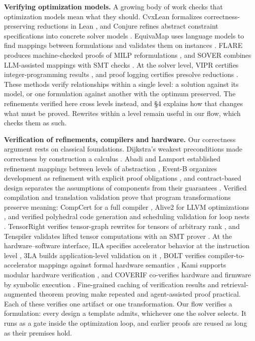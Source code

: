 \documentclass[11pt]{article}
\begin{document}
\textbf{Verifying optimization models.} A growing body of work checks that optimization models mean what they should. CvxLean formalizes correctness-preserving reductions in Lean \cite{r33}, and Conjure refines abstract constraint specifications into concrete solver models \cite{r34}. EquivaMap uses language models to find mappings between formulations and validates them on instances \cite{r13}. FLARE produces machine-checked proofs of MILP reformulations \cite{r11}, and SOVER combines LLM-assisted mappings with SMT checks \cite{r14}. At the solver level, VIPR certifies integer-programming results \cite{r35}, and proof logging certifies presolve reductions \cite{r36}. These methods verify relationships within a single level: a solution against its model, or one formulation against another with the optimum preserved. The refinements verified here cross levels instead, and §4 explains how that changes what must be proved. Rewrites within a level remain useful in our flow, which checks them as such.

\textbf{Verification of refinements, compilers and hardware.} Our correctness argument rests on classical foundations. Dijkstra's weakest preconditions made correctness by construction a calculus \cite{r12}. Abadi and Lamport established refinement mappings between levels of abstraction \cite{r37}, Event-B organizes development as refinement with explicit proof obligations \cite{r38}, and contract-based design separates the assumptions of components from their guarantees \cite{r39}. Verified compilation and translation validation prove that program transformations preserve meaning: CompCert for a full compiler \cite{r53}, Alive2 for LLVM optimizations \cite{r40}, and verified polyhedral code generation and scheduling validation for loop nests \cite{r41,r42}. TensorRight verifies tensor-graph rewrites for tensors of arbitrary rank \cite{r43}, and Tenspiler validates lifted tensor computations with an SMT prover \cite{r44}. At the hardware--software interface, ILA specifies accelerator behavior at the instruction level \cite{r45}, 3LA builds application-level validation on it \cite{r46}, BOLT verifies compiler-to-accelerator mappings against formal hardware semantics \cite{r47}, Kami supports modular hardware verification \cite{r48}, and COVERIF co-verifies hardware and firmware by symbolic execution \cite{r49}. Fine-grained caching of verification results \cite{r50,r51} and retrieval-augmented theorem proving \cite{r52} make repeated and agent-assisted proof practical. Each of these verifies one artifact or one transformation. Our flow verifies a formulation: every design a template admits, whichever one the solver selects. It runs as a gate inside the optimization loop, and earlier proofs are reused as long as their premises hold.
\end{document}
